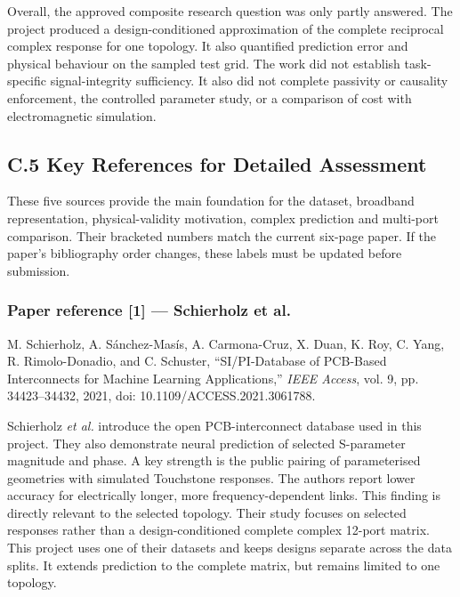 Overall, the approved composite research question was only partly answered.
The project produced a design-conditioned approximation of the complete
reciprocal complex response for one topology. It also quantified prediction
error and physical behaviour on the sampled test grid. The work did not
establish task-specific signal-integrity sufficiency. It also did not complete
passivity or causality enforcement, the controlled parameter study, or a
comparison of cost with electromagnetic simulation.

\twocolumn
\PortfolioAppendixPageStyle
\PortfolioContentPageCommand
{}
{}
\subsection*{C.5 Key References for Detailed Assessment}
\label{app:c-key-references}

These five sources provide the main foundation for the dataset, broadband
representation, physical-validity motivation, complex prediction and multi-port
comparison. Their bracketed numbers match the current six-page paper. If the
paper's bibliography order changes, these labels must be updated before
submission.

\subsubsection*{Paper reference [1] --- Schierholz et al.}
M. Schierholz, A. S\'{a}nchez-Mas\'{i}s, A. Carmona-Cruz, X. Duan, K. Roy,
C. Yang, R. Rimolo-Donadio, and C. Schuster, ``SI/PI-Database of PCB-Based
Interconnects for Machine Learning Applications,'' \emph{IEEE Access}, vol. 9,
pp. 34423--34432, 2021, doi: 10.1109/ACCESS.2021.3061788.

Schierholz \textit{et al.} introduce the open PCB-interconnect database used in
this project. They also demonstrate neural prediction of selected S-parameter
magnitude and phase. A key strength is the public pairing of parameterised
geometries with simulated Touchstone responses. The authors report lower
accuracy for electrically longer, more frequency-dependent links. This finding
is directly relevant to the selected topology. Their study focuses on selected
responses rather than a design-conditioned complete complex 12-port matrix.
This project uses one of their datasets and keeps designs separate across the
data splits. It extends prediction to the complete matrix, but remains limited
to one topology.

